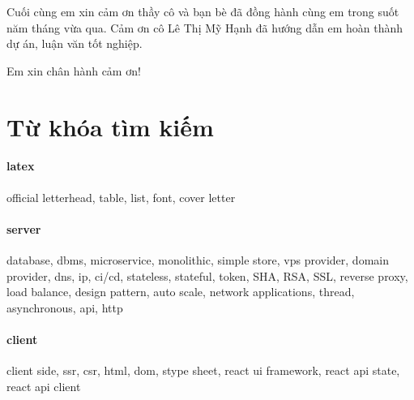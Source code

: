 \documentclass[11pt]{report}
\begin{document}
Cuối cùng em xin cảm ơn thầy cô và bạn bè đã đồng hành cùng em trong suốt năm tháng vừa qua. Cảm ơn cô Lê Thị Mỹ Hạnh đã hướng dẫn em hoàn thành dự án, luận văn tốt nghiệp.

Em xin chân hành cảm ơn!

\pagebreak






\tableofcontents	
{}

\listoftables
{}


\printglossary[title=Danh sách từ viết tắt, toctitle=Danh sách viết tắt]


\section*{Từ khóa tìm kiếm}
\paragraph{latex} official letterhead, table, list, font, cover letter
\paragraph{server} database, dbms, microservice, monolithic, simple store, vps provider, domain provider, dns, ip, ci/cd, stateless, stateful, token, SHA, RSA, SSL, reverse proxy, load balance, design pattern, auto scale, network applications, thread, asynchronous, api, http
\paragraph{client} client side, ssr, csr, html, dom, stype sheet, react ui framework, react api state, react api client
\end{document}
